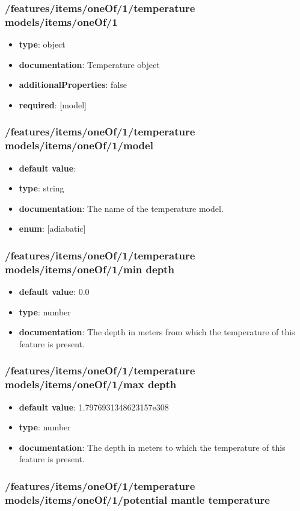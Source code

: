 \subsubsection{/features/items/oneOf/1/temperature models/items/oneOf/1}
\begin{itemize}\item {\bf type}: object
\item {\bf documentation}: Temperature object
\item {\bf additionalProperties}: false
\item {\bf required}: [model]\end{itemize}
\subsubsection{/features/items/oneOf/1/temperature models/items/oneOf/1/model}
\begin{itemize}\item {\bf default value}: 
\item {\bf type}: string
\item {\bf documentation}: The name of the temperature model.
\item {\bf enum}: [adiabatic]\end{itemize}\subsubsection{/features/items/oneOf/1/temperature models/items/oneOf/1/min depth}
\begin{itemize}\item {\bf default value}: 0.0
\item {\bf type}: number
\item {\bf documentation}: The depth in meters from which the temperature of this feature is present.
\end{itemize}\subsubsection{/features/items/oneOf/1/temperature models/items/oneOf/1/max depth}
\begin{itemize}\item {\bf default value}: 1.7976931348623157e308
\item {\bf type}: number
\item {\bf documentation}: The depth in meters to which the temperature of this feature is present.
\end{itemize}\subsubsection{/features/items/oneOf/1/temperature models/items/oneOf/1/potential mantle temperature}

